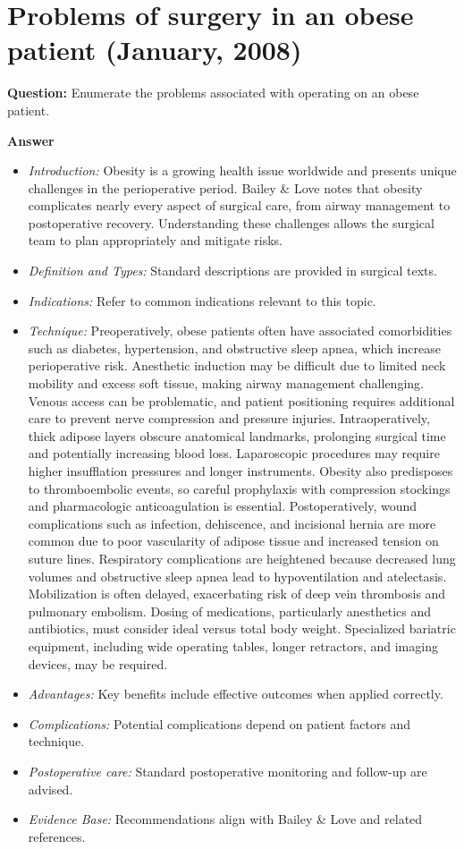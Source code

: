 \documentclass{article}
\begin{document}
\section{Problems of surgery in an obese patient (January, 2008)}

\textbf{Question:} Enumerate the problems associated with operating on an obese patient.

\textbf{Answer}
\begin{itemize}

\item \emph{Introduction:} Obesity is a growing health issue worldwide and presents unique challenges in the perioperative period. Bailey \& Love notes that obesity complicates nearly every aspect of surgical care, from airway management to postoperative recovery. Understanding these challenges allows the surgical team to plan appropriately and mitigate risks.
\item \emph{Definition and Types:} Standard descriptions are provided in surgical texts.
\item \emph{Indications:} Refer to common indications relevant to this topic.

\item \emph{Technique:} Preoperatively, obese patients often have associated comorbidities such as diabetes, hypertension, and obstructive sleep apnea, which increase perioperative risk. Anesthetic induction may be difficult due to limited neck mobility and excess soft tissue, making airway management challenging. Venous access can be problematic, and patient positioning requires additional care to prevent nerve compression and pressure injuries. Intraoperatively, thick adipose layers obscure anatomical landmarks, prolonging surgical time and potentially increasing blood loss. Laparoscopic procedures may require higher insufflation pressures and longer instruments. Obesity also predisposes to thromboembolic events, so careful prophylaxis with compression stockings and pharmacologic anticoagulation is essential. Postoperatively, wound complications such as infection, dehiscence, and incisional hernia are more common due to poor vascularity of adipose tissue and increased tension on suture lines. Respiratory complications are heightened because decreased lung volumes and obstructive sleep apnea lead to hypoventilation and atelectasis. Mobilization is often delayed, exacerbating risk of deep vein thrombosis and pulmonary embolism. Dosing of medications, particularly anesthetics and antibiotics, must consider ideal versus total body weight. Specialized bariatric equipment, including wide operating tables, longer retractors, and imaging devices, may be required.
\item \emph{Advantages:} Key benefits include effective outcomes when applied correctly.
\item \emph{Complications:} Potential complications depend on patient factors and technique.
\item \emph{Postoperative care:} Standard postoperative monitoring and follow-up are advised.
\item \emph{Evidence Base:} Recommendations align with Bailey \& Love and related references.
\end{itemize}
\end{document}
